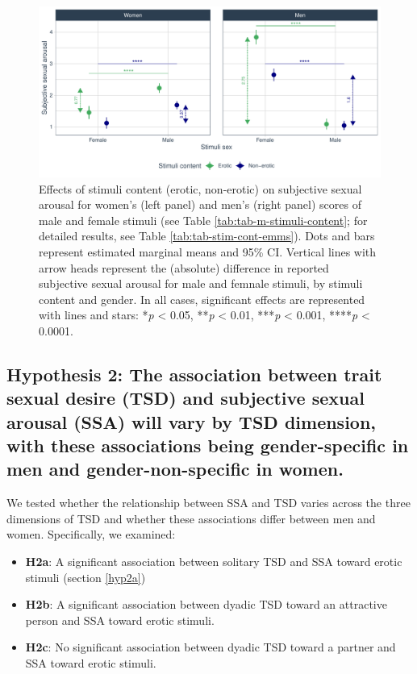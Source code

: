 \documentclass[
  bookmarksnumbered]{article}
\providecommand{\tightlist}{%
  \setlength{\itemsep}{0pt}\setlength{\parskip}{0pt}}
\begin{document}
\begin{figure}
\centering
\includegraphics{Sexual_Desire_Arousal_V2_files/figure-latex/fig-m-stimuli-content-1.pdf}
\caption{\label{fig:fig-m-stimuli-content}Effects of stimuli content (erotic, non-erotic) on subjective sexual arousal for women's (left panel) and men's (right panel) scores of male and female stimuli (see Table \ref{tab:tab-m-stimuli-content}; for detailed results, see Table \ref{tab:tab-stim-cont-emms}). Dots and bars represent estimated marginal means and 95\% CI. Vertical lines with arrow heads represent the (absolute) difference in reported subjective sexual arousal for male and femnale stimuli, by stimuli content and gender. In all cases, significant effects are represented with lines and stars: *\emph{p} \textless{} 0.05, **\emph{p} \textless{} 0.01, ***\emph{p} \textless{} 0.001, ****\emph{p} \textless{} 0.0001.}
\end{figure}

\subsection{Hypothesis 2: The association between trait sexual desire (TSD) and subjective sexual arousal (SSA) will vary by TSD dimension, with these associations being gender-specific in men and gender-non-specific in women.}\label{hyp2}

We tested whether the relationship between SSA and TSD varies across the three dimensions of TSD and whether these associations differ between men and women. Specifically, we examined:

\begin{itemize}
\tightlist
\item
  \textbf{H2a}: A significant association between solitary TSD and SSA toward erotic stimuli (section \ref{hyp2a})
\item
  \textbf{H2b}: A significant association between dyadic TSD toward an attractive person and SSA toward erotic stimuli.
\item
  \textbf{H2c}: No significant association between dyadic TSD toward a partner and SSA toward erotic stimuli.
\end{itemize}
\end{document}
